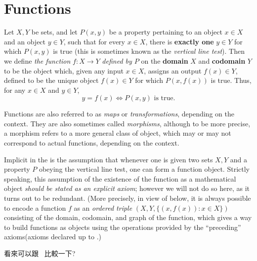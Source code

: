 \section{Functions} \label{sec 3.3}

\begin{definition} [Functions] \label{def 3.3.1}
Let \(X, Y\) be sets, and let \(P(x, y)\) be a property pertaining to an object \(x \in X\) and an object \(y \in Y\), such that for every \(x \in X\), there is \textbf{exactly one} \(y \in Y\) for which \(P(x, y)\) is true (this is sometimes known as the \emph{vertical line test}). Then we define \emph{the function} \(f : X \longrightarrow Y\) \emph{defined by \(P\)} on the \textbf{domain} \(X\) and \textbf{codomain} \(Y\) to be the object which, given any input \(x \in X\), assigns an output \(f(x) \in Y\), defined to be the unique object \(f(x) \in Y\) for which \(P(x, f(x))\) is true. Thus, for any \(x \in X\) and \(y \in Y\),
\[
    y = f(x) \iff P(x, y) \text{ is true}.
\]
\end{definition}

\begin{note}
Functions are also referred to as \emph{maps} or \emph{transformations}, depending on the context. They are also sometimes called \emph{morphisms}, although to be more precise, a morphism refers to a more general class of object, which may or may not correspond to actual functions, depending on the context.

Implicit in the  is the assumption that whenever one is given two sets \(X, Y\) and a property \(P\) obeying the vertical line test, one can form a function object. Strictly speaking, this assumption of the existence of the function as a mathematical object \emph{should be stated as an explicit axiom}; however we will not do so here, as it turns out to be redundant. (More precisely, in view of  below, it is always possible to encode a function \(f\) as an \emph{ordered triple} \((X, Y, \{ (x,f(x)): x \in X \})\) consisting of the domain, codomain, and graph of the function, which gives a way to build functions as objects using the operations provided by the ``preceding'' axioms(axioms declared up to .)
\end{note}

\begin{note}
 看來可以跟\  比較一下?
\end{note}

